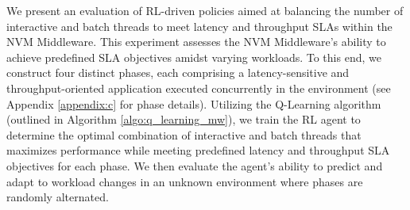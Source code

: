 


We present an evaluation of RL-driven policies aimed at balancing the number of interactive and batch threads to meet latency and throughput SLAs within the NVM Middleware. This experiment assesses the NVM Middleware's ability to achieve predefined SLA objectives amidst varying workloads. To this end, we construct four distinct phases, each comprising a latency-sensitive and throughput-oriented application executed concurrently in the environment (see Appendix \ref{appendix:c} for phase details). Utilizing the Q-Learning algorithm (outlined in Algorithm \ref{algo:q_learning_mw}), we train the RL agent to determine the optimal combination of interactive and batch threads that maximizes performance while meeting predefined latency and throughput SLA objectives for each phase. We then evaluate the agent's ability to predict and adapt to workload changes in an unknown environment where phases are randomly alternated.

